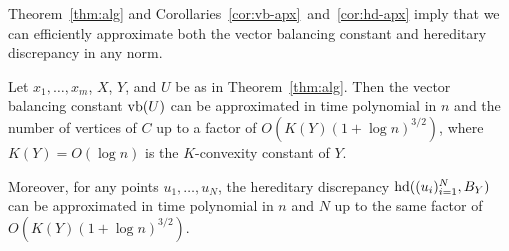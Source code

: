 Theorem~\ref{thm:alg} and
Corollaries~\ref{cor:vb-apx}~and~\ref{cor:hd-apx} imply that we can efficiently
approximate both the vector balancing constant and hereditary
discrepancy in any norm.

\begin{corollary}
  Let $x_1, \ldots, x_m$, $X$, $Y$, and $U$ be as in
  Theorem~\ref{thm:alg}.  Then the vector
  balancing constant $\operatorname{vb}(U)$ can be approximated in time
  polynomial in $n$ and the number of vertices of $C$ up to a factor
  of $O(K(Y)(1 + \log n)^{3/2})$, where $K(Y) = O(\log n)$ is the
  $K$-convexity constant of $Y$.

  Moreover, for any points $u_1, \ldots, u_N$, the hereditary
  discrepancy $\operatorname{hd}((u_i)_{i = 1}^N, B_Y)$ can be approximated in time
  polynomial in $n$ and $N$ up to the same factor of  $O(K(Y)(1 + \log
  n)^{3/2})$. 
\end{corollary}

